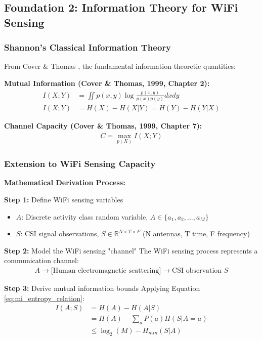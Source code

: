 \documentclass[12pt,a4paper]{article}
\begin{document}
\subsection{Foundation 2: Information Theory for WiFi Sensing}

\subsubsection{Shannon's Classical Information Theory}

From Cover \& Thomas \cite{cover1999elements}, the fundamental information-theoretic quantities:

\textbf{Mutual Information (Cover \& Thomas, 1999, Chapter 2):}
\begin{align}
I(X;Y) &= \iint p(x,y) \log \frac{p(x,y)}{p(x)p(y)} dx dy \label{eq:shannon_mi}\\
I(X;Y) &= H(X) - H(X|Y) = H(Y) - H(Y|X) \label{eq:mi_entropy_relation}
\end{align}

\textbf{Channel Capacity (Cover \& Thomas, 1999, Chapter 7):}
\begin{align}
C = \max_{p(X)} I(X;Y) \label{eq:shannon_capacity}
\end{align}

\subsubsection{Extension to WiFi Sensing Capacity}

\textbf{Mathematical Derivation Process:}

\textbf{Step 1:} Define WiFi sensing variables
\begin{itemize}
\item $A$: Discrete activity class random variable, $A \in \{a_1, a_2, ..., a_M\}$
\item $S$: CSI signal observations, $S \in \mathbb{R}^{N \times T \times F}$ (N antennas, T time, F frequency)
\end{itemize}

\textbf{Step 2:} Model the WiFi sensing "channel"
The WiFi sensing process represents a communication channel:
\begin{align}
A \rightarrow \text{[Human electromagnetic scattering]} \rightarrow \text{CSI observation } S
\end{align}

\textbf{Step 3:} Derive mutual information bounds
Applying Equation \ref{eq:mi_entropy_relation}:
\begin{align}
I(A;S) &= H(A) - H(A|S) \label{eq:wifi_mi_basic}\\
&= H(A) - \sum_{a} P(a)H(S|A=a) \label{eq:wifi_mi_expanded}\\
&\leq \log_2(M) - H_{min}(S|A) \label{eq:wifi_mi_bound}
\end{align}
\end{document}
